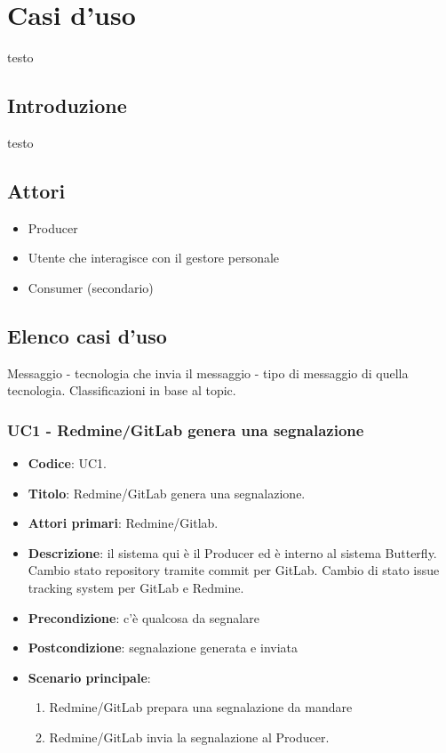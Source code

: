 \newpage
\section{Casi d'uso}
testo

	\subsection{Introduzione}
	testo
	
	\subsection{Attori}
	\begin{itemize}
		\item Producer
		\item Utente che interagisce con il gestore personale
		\item Consumer (secondario)
	\end{itemize}
	
	\subsection{Elenco casi d'uso}
	Messaggio - tecnologia che invia il messaggio - tipo di messaggio di quella tecnologia.
	Classificazioni in base al topic.





\subsubsection{UC1 - Redmine/GitLab genera una segnalazione}
	\begin{itemize}
		\item \textbf{Codice}: UC1.
		\item \textbf{Titolo}: Redmine/GitLab genera una segnalazione.
		\item \textbf{Attori primari}: Redmine/Gitlab.
		\item \textbf{Descrizione}:
		 il sistema qui è il Producer ed è interno al sistema Butterfly. Cambio stato repository tramite commit per GitLab. Cambio di stato issue tracking system per GitLab e Redmine.
		\item \textbf{Precondizione}: c'è qualcosa da segnalare
		\item \textbf{Postcondizione}: segnalazione generata e inviata
		\item \textbf{Scenario principale}: 
		\begin{enumerate}
			\item Redmine/GitLab prepara una segnalazione da mandare
			\item Redmine/GitLab invia la segnalazione al Producer.
		\end{enumerate}
		
	\end{itemize}

